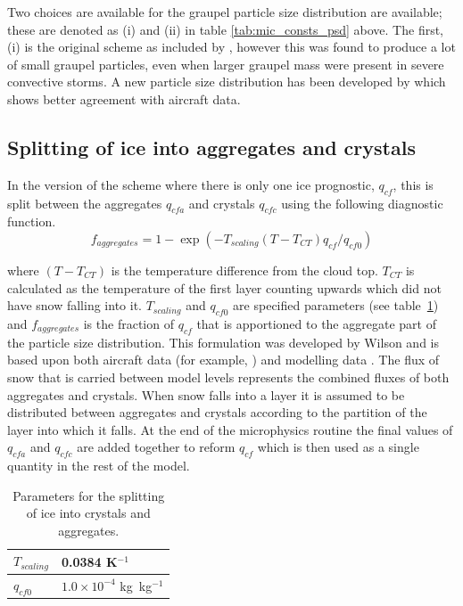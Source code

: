 \documentclass{UMDP_article}
\def\bq{\begin{equation}}
\def\eq{\end{equation}}
\begin{document}
Two choices are available for the graupel particle size distribution are 
available; these are denoted as (i) and (ii) in table \ref{tab:mic_consts_psd}
above. The first, (i) is the original scheme as included by 
\cite{Forbes:Halliwell:2003}, however this was found to produce a lot of
small graupel particles, even when larger graupel mass were present in severe
convective storms. A new particle size distribution has been developed by
\cite{Field:etal:2019} which shows better agreement with aircraft data.

\subsection{Splitting of ice into aggregates and crystals}

In the version of the scheme where there is only one ice prognostic, $q_{cf}$, 
this is split between the aggregates $q_{cfa}$ and crystals $q_{cfc}$ using the
following diagnostic function.
\bq
f_{aggregates} = 1 - \exp \left( - T_{scaling} (T-T_{CT}) q_{cf} / q_{cf0} \right)
\label{eq:cry_agg_split}
\eq

where $(T-T_{CT})$ is the temperature difference from the cloud top. $T_{CT}$ is 
calculated as the temperature of the first layer counting upwards which did not 
have snow falling into it. $T_{scaling}$ and $q_{cf0}$ are specified parameters 
(see table~\ref{tab:mic_split}) and $f_{aggregates}$ is
the fraction of $q_{cf}$ that is apportioned to the aggregate part of the particle
size distribution. This formulation was developed by Wilson and is based upon
both aircraft data (for example, \citealp{Field:1999}) and modelling data 
\citep{Cardwell:etal:2002}.
The flux of snow that is carried between model levels represents
the combined fluxes of both aggregates and crystals. When snow falls into a layer
it is assumed to be distributed between aggregates and crystals according to the
partition of the layer into which it falls. At the end of the microphysics routine
the final values of $q_{cfa}$ and $q_{cfc}$ are added together to reform
$q_{cf}$ which is then used as a single quantity in the rest of the model.

\begin{table}[ht!]
\begin{center}
\begin{tabular}{l|l}
\hline
$T_{scaling}$   &  0.0384 K$^{-1}$                   \\  \hline
$q_{cf0}$      &  $1.0 \times 10^{-4}$ kg~kg$^{-1}$   \\  \hline
\end{tabular}
\end{center}
\caption{Parameters for the splitting of ice into crystals and aggregates.}
\label{tab:mic_split}
\end{table}
\end{document}
